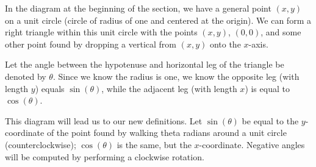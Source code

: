 \documentclass[lang=en,11pt]{elegantbook}
\begin{document}
In the diagram at the beginning of the section, we have a general point $(x,y)$ on a unit circle (circle of radius of one and centered at the origin). We can form a right triangle within this unit circle with the points $(x,y)$, $(0,0)$, and some other point found by dropping a vertical from $(x,y)$ onto the $x$-axis.

Let the angle between the hypotenuse and horizontal leg of the triangle be denoted by $\theta$. Since we know the radius is one, we know the opposite leg (with length $y$) equals $\sin(\theta)$, while the adjacent leg (with length $x$) is equal to $\cos(\theta)$.

This diagram will lead us to our new definitions. Let $\sin(\theta)$ be equal to the $y$-coordinate of the point found by walking theta radians around a unit circle (counterclockwise); $\cos(\theta)$ is the same, but the $x$-coordinate. Negative angles will be computed by performing a clockwise rotation.
\end{document}

